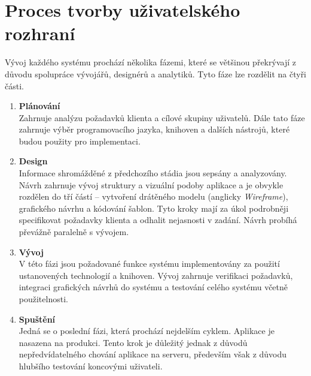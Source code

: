 \chapter{Proces tvorby uživatelského rozhraní}
\label{chap:process}

\begin{quote}
\end{quote}

\noindent
Vývoj každého systému prochází několika fázemi, které se většinou překrývají z důvodu spolupráce vývojářů, designérů a analytiků. Tyto fáze lze rozdělit na čtyři části.

\begin{enumerate}[leftmargin=1cm]
    \item \textbf{Plánování}\\
          Zahrnuje analýzu požadavků klienta a cílové skupiny uživatelů. Dále tato fáze zahrnuje výběr programovacího jazyka, knihoven a dalších nástrojů, které budou použity pro implementaci.

    \item \textbf{Design}\\
          Informace shromážděné z předchozího stádia jsou sepsány a analyzovány. Návrh zahrnuje vývoj struktury a vizuální podoby aplikace a je obvykle rozdělen do tří částí -- vytvoření drátěného modelu (anglicky \textit{Wireframe}), grafického návrhu a kódování šablon. Tyto kroky mají za úkol podrobněji specifikovat požadavky klienta a odhalit nejasnosti v zadání. Návrh probíhá převážně paralelně s vývojem.

    \item \textbf{Vývoj}\\
          V této fázi jsou požadované funkce systému implementovány za použití ustanovených technologií a knihoven. Vývoj zahrnuje verifikaci požadavků, integraci grafických návrhů do systému a testování celého systému včetně použitelnosti.

    \item \textbf{Spuštění}\\
           Jedná se o poslední fázi, která prochází nejdelším cyklem. Aplikace je nasazena na produkci. Tento krok je důležitý jednak z důvodů nepředvídatelného chování aplikace na serveru, především však z důvodu hlubšího testování koncovými uživateli.

\end{enumerate}

